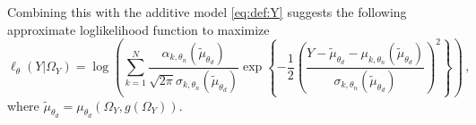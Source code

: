 \documentclass{article}
\begin{document}
Combining this with the additive model  \eqref{eq:def:Y} suggests the following approximate loglikelihood function to maximize
$$
\ell_{\theta}(Y|\Omega_{Y}) = \log\left(\sum_{k=1}^N\frac{\alpha_{k,\theta_n}(\tilde\mu_{\theta_d})}{\sqrt{2\pi }\sigma_{k,\theta_n}(\tilde\mu_{\theta_d})}\exp\left\{-\frac{1}{2}\left(\frac{Y-\tilde\mu_{\theta_d} -  \mu_{k,\theta_n}(\tilde\mu_{\theta_d})}{\sigma_{k,\theta_n}(\tilde\mu_{\theta_d})}\right)^2\right\}\right)\,,
$$
where $\tilde \mu_{\theta_d} = \mu_{\theta_d}(\Omega_{Y},g(\Omega_{Y}))$.
%
\end{document}
